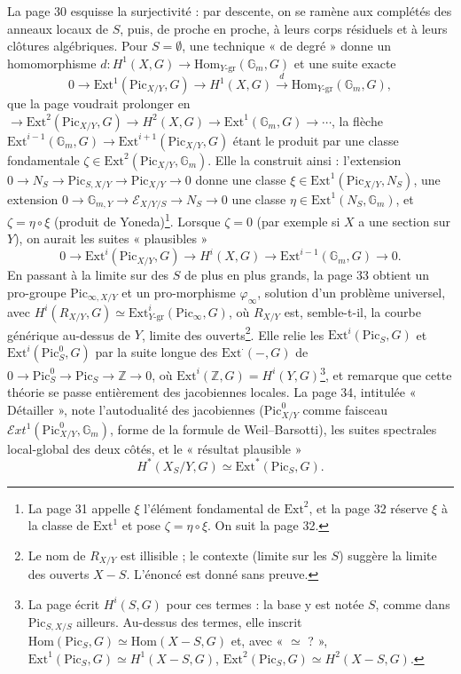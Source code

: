 \documentclass[11pt,a4paper]{article}
\begin{document}
La page 30 esquisse la surjectivité : par descente, on se ramène aux complétés
des anneaux locaux de $S$, puis, de proche en proche, à leurs corps résiduels et
à leurs clôtures algébriques. Pour $S = \emptyset$, une technique « de degré »
donne un homomorphisme $d : H^1(X, G) \to \mathrm{Hom}_{Y\text{-gr}}(\mathbb{G}_m,
G)$ et une suite exacte
\[
0 \to \mathrm{Ext}^1(\mathrm{Pic}_{X/Y}, G) \to H^1(X, G) \xrightarrow{\ d\ }
\mathrm{Hom}_{Y\text{-gr}}(\mathbb{G}_m, G),
\]
que la page voudrait prolonger en $\to \mathrm{Ext}^2(\mathrm{Pic}_{X/Y}, G) \to
H^2(X, G) \to \mathrm{Ext}^1(\mathbb{G}_m, G) \to \cdots$, la flèche
$\mathrm{Ext}^{i-1}(\mathbb{G}_m, G) \to \mathrm{Ext}^{i+1}(\mathrm{Pic}_{X/Y}, G)$
étant le produit par une classe fondamentale
$\zeta \in \mathrm{Ext}^2(\mathrm{Pic}_{X/Y}, \mathbb{G}_m)$. Elle la construit
ainsi : l'extension $0 \to N_S \to \mathrm{Pic}_{S,X/Y} \to \mathrm{Pic}_{X/Y} \to
0$ donne une classe $\xi \in \mathrm{Ext}^1(\mathrm{Pic}_{X/Y}, N_S)$, une
extension $0 \to \mathbb{G}_{m,Y} \to \mathcal{E}_{X/Y/S} \to N_S \to 0$ une classe
$\eta \in \mathrm{Ext}^1(N_S, \mathbb{G}_m)$, et $\zeta = \eta \circ \xi$ (produit
de Yoneda)\footnote{La page 31 appelle $\xi$ l'élément fondamental de
$\mathrm{Ext}^2$, et la page 32 réserve $\xi$ à la classe de $\mathrm{Ext}^1$ et
pose $\zeta = \eta \circ \xi$. On suit la page 32.}. Lorsque $\zeta = 0$ (par
exemple si $X$ a une section sur $Y$), on aurait les suites « plausibles »
\[
0 \to \mathrm{Ext}^i(\mathrm{Pic}_{X/Y}, G) \to H^i(X, G) \to
\mathrm{Ext}^{i-1}(\mathbb{G}_m, G) \to 0.
\]
En passant à la limite sur des $S$ de plus en plus grands, la page 33 obtient un
pro-groupe $\mathrm{Pic}_{\infty, X/Y}$ et un pro-morphisme $\varphi_\infty$, solution
d'un problème universel, avec $H^i(R_{X/Y}, G) \simeq
\mathrm{Ext}^i_{Y\text{-gr}}(\mathrm{Pic}_\infty, G)$, où $R_{X/Y}$ est, semble-t-il,
la courbe générique au-dessus de $Y$, limite des ouverts\footnote{Le nom de
$R_{X/Y}$ est illisible ; le contexte (limite sur les $S$) suggère la limite des
ouverts $X - S$. L'énoncé est donné sans preuve.}. Elle relie les
$\mathrm{Ext}^i(\mathrm{Pic}_S, G)$ et $\mathrm{Ext}^i(\mathrm{Pic}^0_S, G)$ par la
suite longue des $\mathrm{Ext}^{\cdot}(-, G)$ de $0 \to \mathrm{Pic}^0_S \to
\mathrm{Pic}_S \to \mathbb{Z} \to 0$, où $\mathrm{Ext}^i(\mathbb{Z}, G) = H^i(Y,
G)$\footnote{La page écrit $H^i(S, G)$ pour ces termes : la base y est notée $S$,
comme dans $\mathrm{Pic}_{S,X/S}$ ailleurs. Au-dessus des termes, elle inscrit
$\mathrm{Hom}(\mathrm{Pic}_S, G) \simeq \mathrm{Hom}(X - S, G)$ et, avec « $\simeq$
? », $\mathrm{Ext}^1(\mathrm{Pic}_S, G) \simeq H^1(X - S, G)$,
$\mathrm{Ext}^2(\mathrm{Pic}_S, G) \simeq H^2(X - S, G)$.}, et remarque que cette
théorie se passe entièrement des jacobiennes locales. La page 34, intitulée
« Détailler », note l'autodualité des jacobiennes ($\mathrm{Pic}^0_{X/Y}$ comme
faisceau $\mathcal{E}xt^1(\mathrm{Pic}^0_{X/Y}, \mathbb{G}_m)$, forme de la
formule de Weil–Barsotti), les suites spectrales local-global des deux côtés, et
le « résultat plausible »
\[
H^{*}(X_S/Y, G) \simeq \mathrm{Ext}^{*}(\mathrm{Pic}_S, G).
\]
\end{document}
